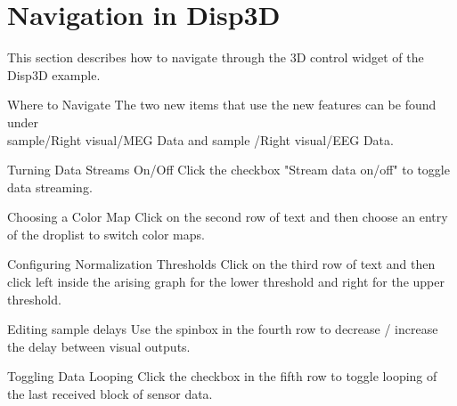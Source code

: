 \section{Navigation in Disp3D}

This section describes how to navigate through the 3D control widget of the Disp3D example.

\begin{aims}
	\item[\hspace*{10mm} Where to Navigate] The two new items that use the new features can be found under\\ sample/Right visual/MEG Data and sample /Right visual/EEG Data.
\end{aims}
	
	
\begin{aims}
	\item[\hspace*{10mm} Turning Data Streams On/Off] Click the checkbox "Stream data on/off" to toggle data streaming.
\end{aims}

\begin{aims}
	\item[\hspace*{10mm} Choosing a Color Map] Click on the second row of text and then choose an entry of the droplist to switch color maps.
\end{aims}

\begin{aims}
	\item[\hspace*{10mm} Configuring Normalization Thresholds] Click on the third row of text and then click left inside the arising graph for the lower threshold and right for the upper threshold.
\end{aims}

\begin{aims}
	\item[\hspace*{10mm} Editing sample delays] Use the spinbox in the fourth row to decrease / increase the delay between visual outputs. 
\end{aims}

\begin{aims}
	\item[\hspace*{10mm} Toggling Data Looping] Click the checkbox in the fifth row to toggle looping of the last received block of sensor data.
\end{aims}

